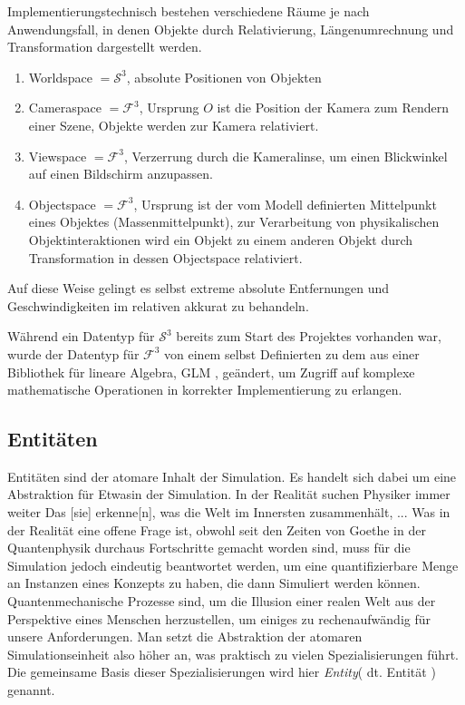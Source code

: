 Implementierungstechnisch bestehen verschiedene Räume je nach Anwendungsfall, in denen Objekte durch Relativierung, Längenumrechnung und Transformation dargestellt werden.

\begin{enumerate}
\item Worldspace $= \mathcal{S}^3$, absolute Positionen von Objekten
\item Cameraspace $= \mathcal{F}^3$, Ursprung $O$ ist die Position der Kamera zum Rendern einer Szene, Objekte werden zur Kamera relativiert.
\item Viewspace $= \mathcal{F}^3$, Verzerrung durch die Kameralinse, um einen Blickwinkel auf einen Bildschirm anzupassen.
\item Objectspace $= \mathcal{F}^3$, Ursprung ist der vom Modell definierten Mittelpunkt eines Objektes (Massenmittelpunkt), zur Verarbeitung von physikalischen Objektinteraktionen wird ein Objekt zu einem anderen Objekt durch Transformation in dessen Objectspace relativiert.
\end{enumerate}

Auf diese Weise gelingt es selbst extreme absolute Entfernungen und Geschwindigkeiten im relativen akkurat zu behandeln.

Während ein Datentyp für $\mathcal{S}^3$ bereits zum Start des Projektes vorhanden war, wurde der Datentyp für $\mathcal{F}^3$ von einem selbst Definierten zu dem aus einer Bibliothek für lineare Algebra, GLM %
, geändert, um Zugriff auf komplexe mathematische Operationen in korrekter Implementierung zu erlangen.

\subsection{Entitäten}
\label{sec:entity}
Entitäten sind der atomare Inhalt der Simulation. Es handelt sich dabei um eine Abstraktion für \glqq Etwas\grqq  in der Simulation. In der Realität suchen Physiker immer weiter \glqq Das [sie] erkenne[n], was die Welt im Innersten zusammenhält, ... Was in der Realität eine offene Frage ist, obwohl seit den Zeiten von Goethe in der Quantenphysik durchaus Fortschritte gemacht worden sind, muss für die Simulation jedoch eindeutig beantwortet werden, um eine quantifizierbare Menge an Instanzen eines Konzepts zu haben, die dann Simuliert werden können.\\
Quantenmechanische Prozesse sind, um die Illusion einer realen Welt aus der Perspektive eines Menschen herzustellen, um einiges zu rechenaufwändig für unsere Anforderungen. Man setzt die Abstraktion der atomaren Simulationseinheit also höher an, was praktisch zu vielen Spezialisierungen führt. Die gemeinsame Basis dieser Spezialisierungen wird hier \textit{Entity}( dt. Entität ) genannt.\\

